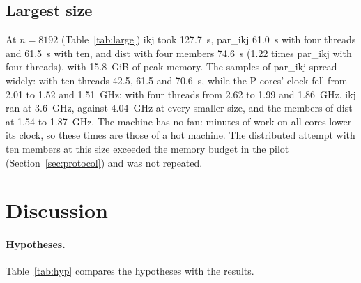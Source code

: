 \documentclass[11pt,a4paper]{article}
\newcommand{\tabledir}{../analysis/tables}
\begin{document}
\subsection{Largest size}
\label{sec:large}

\begin{table}[htbp]
\centering\footnotesize\setlength{\tabcolsep}{3.5pt}
\caption{$n=8192$ (D\_large).}
\label{tab:large}

\end{table}

At $n=8192$ (Table~\ref{tab:large}) ikj took 127.7~s, par\_ikj 61.0~s with four
threads and 61.5~s with ten, and dist with four members 74.6~s (1.22 times
par\_ikj with four threads), with 15.8~GiB of peak memory. The samples of
par\_ikj spread widely: with ten threads 42.5, 61.5 and 70.6~s, while the P
cores' clock fell from 2.01 to 1.52 and 1.51~GHz; with four threads from 2.62 to
1.99 and 1.86~GHz. ikj ran at 3.6~GHz, against 4.04~GHz at every smaller size,
and the members of dist at 1.54 to 1.87~GHz. The machine has no fan: minutes of
work on all cores lower its clock, so these times are those of a hot machine.
The distributed attempt with ten members at this size exceeded the memory
budget in the pilot (Section~\ref{sec:protocol}) and was not repeated.

\section{Discussion}
\label{sec:discussion}

\paragraph{Hypotheses.} Table~\ref{tab:hyp} compares the hypotheses with the
results.
\end{document}
